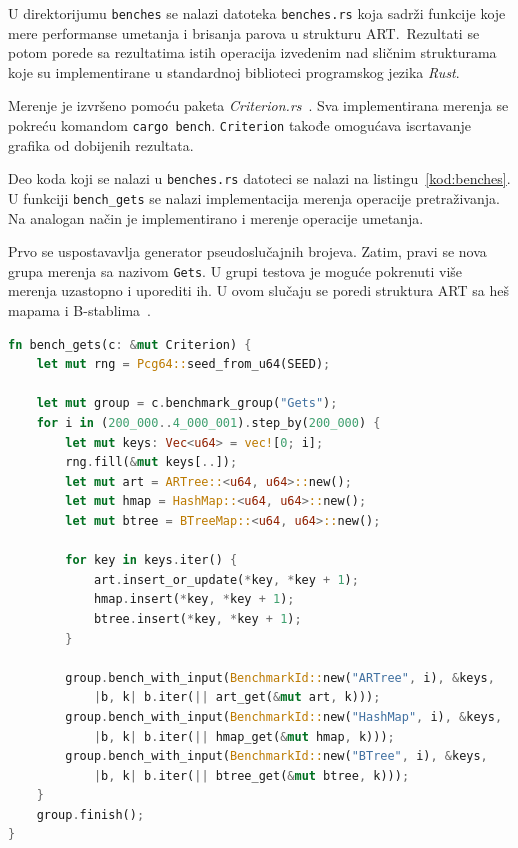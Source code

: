 \documentclass[12pt,oneside]{memoir}
\begin{document}
U direktorijumu \texttt{benches} se nalazi datoteka \texttt{benches.rs}
koja sadrži funkcije koje mere performanse umetanja i brisanja parova u
strukturu ART.\ Rezultati se potom porede sa rezultatima istih operacija
izvedenim nad sličnim strukturama koje su implementirane u standardnoj
biblioteci programskog jezika \textit{Rust}.

Merenje je izvršeno pomoću paketa \textit{Criterion.rs}~\cite{criterion}.
Sva implementirana merenja se pokreću komandom \texttt{cargo bench}.
\texttt{Criterion} takođe
omogućava iscrtavanje grafika od dobijenih rezultata.

Deo koda koji se nalazi u \texttt{benches.rs} datoteci se nalazi na
listingu~\ref{kod:benches}. U funkciji \texttt{bench\_gets} se nalazi
implementacija merenja operacije pretraživanja.
Na analogan način je implementirano i merenje operacije umetanja.

Prvo se uspostavavlja generator pseudoslučajnih brojeva. Zatim,
pravi se nova grupa merenja sa nazivom \texttt{Gets}. U grupi testova
je moguće pokrenuti više merenja uzastopno i uporediti ih.
U ovom slučaju se poredi struktura ART sa heš mapama i
B-stablima~\cite{btree}.

\begin{lstlisting}[language=Rust,
                   caption={Funkcija \texttt{bench\_gets}},
                   label={kod:benches}]
fn bench_gets(c: &mut Criterion) {
    let mut rng = Pcg64::seed_from_u64(SEED);

    let mut group = c.benchmark_group("Gets");
    for i in (200_000..4_000_001).step_by(200_000) {
        let mut keys: Vec<u64> = vec![0; i];
        rng.fill(&mut keys[..]);
        let mut art = ARTree::<u64, u64>::new();
        let mut hmap = HashMap::<u64, u64>::new();
        let mut btree = BTreeMap::<u64, u64>::new();

        for key in keys.iter() {
            art.insert_or_update(*key, *key + 1);
            hmap.insert(*key, *key + 1);
            btree.insert(*key, *key + 1);
        }

        group.bench_with_input(BenchmarkId::new("ARTree", i), &keys,
            |b, k| b.iter(|| art_get(&mut art, k)));
        group.bench_with_input(BenchmarkId::new("HashMap", i), &keys,
            |b, k| b.iter(|| hmap_get(&mut hmap, k)));
        group.bench_with_input(BenchmarkId::new("BTree", i), &keys,
            |b, k| b.iter(|| btree_get(&mut btree, k)));
    }
    group.finish();
}

\end{lstlisting}
\end{document}
